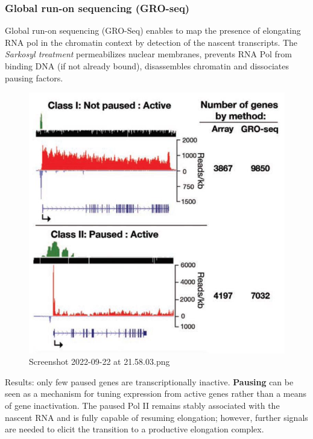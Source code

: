 \hypertarget{global-run-on-sequencing-gro-seq}{%
\subsubsection{Global run-on sequencing (GRO-seq)}\label{global-run-on-sequencing-gro-seq}}

Global run-on sequencing (GRO-Seq) enables to map the presence of elongating RNA pol in the chromatin context by detection of the nascent transcripts. The \emph{Sarkosyl treatment} permeabilizes nuclear membranes, prevents RNA Pol from binding DNA (if not already bound), disassembles chromatin and dissociates pausing factors.

\begin{figure}
\centering
\includegraphics[width=\textwidth]{../_resources/Screenshot_2022-09-22_at_21-58-03.png}
\caption{Screenshot 2022-09-22 at 21.58.03.png}
\end{figure}

Results: only few paused genes are transcriptionally inactive.
\textbf{Pausing} can be seen as a mechanism for tuning expression from active genes rather than a means of gene inactivation. The paused Pol II remains stably associated with the nascent RNA and is fully capable of resuming elongation; however, further signals are needed to elicit the transition to a productive elongation complex.

